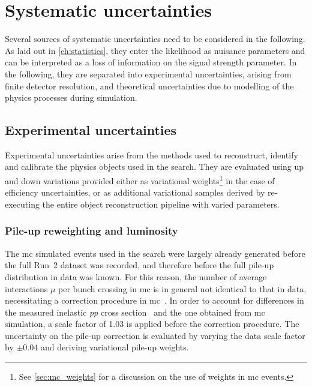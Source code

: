 

\chapter{Systematic uncertainties}\label{ch:uncertainties}

\ifpdf
    \graphicspath{{chapter-uncertainties/Figs/Raster/}{chapter-uncertainties/Figs/PDF/}{chapter-uncertainties/Figs/}}
\else
    \graphicspath{{chapter-uncertainties/Figs/Vector/}{chapter-uncertainties/Figs/}}
\fi

Several sources of systematic uncertainties need to be considered in the following. As laid out in \cref{ch:statistics}, they enter the likelihood as nuisance parameters and can be interpreted as a loss of information on the signal strength parameter. In the following, they are separated into experimental uncertainties, arising \eg from finite detector resolution, and theoretical uncertainties due to modelling of the physics processes during simulation. 

\section{Experimental uncertainties}

Experimental uncertainties arise from the methods used to reconstruct, identify and calibrate the physics objects used in the \onelepton search.
They are evaluated using up and down variations provided either as variational weights\footnote{See \cref{sec:mc_weights} for a discussion on the use of weights in \gls{mc} events.} in the case of efficiency uncertainties, or as additional variational samples derived by re-executing the entire object reconstruction pipeline with varied parameters.

\subsection{Pile-up reweighting and luminosity}

The \gls{mc} simulated events used in the \onelepton search were largely already generated before the full Run~2 dataset was recorded, and therefore before the full pile-up distribution in data was known.
For this reason, the number of average interactions $\mu$ per bunch crossing in \gls{mc} is in general not identical to that in data, necessitating a correction procedure in \gls{mc}~\cite{Buttinger:2014726}.
In order to account for differences in the measured inelastic \textit{pp} cross section~\cite{STDM-2015-05} and the one obtained from \gls{mc} simulation, a scale factor of 1.03 is applied before the correction procedure.
The uncertainty on the pile-up correction is evaluated by varying the data scale factor by $\pm 0.04$ and deriving variational pile-up weights.

